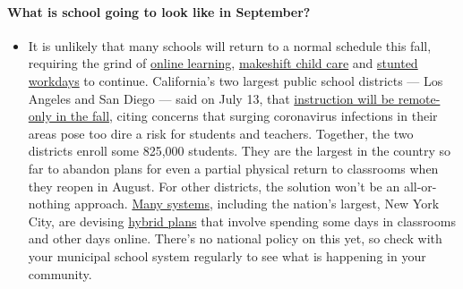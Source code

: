 \begin{itemize}
{  \paragraph{What is school going to look like in
  September?}\label{what-is-school-going-to-look-like-in-september}}

  \begin{itemize}
  \tightlist
  \item
    It is unlikely that many schools will return to a normal schedule
    this fall, requiring the grind of
    \href{https://www.nytimes3xbfgragh.onion/2020/06/05/us/coronavirus-education-lost-learning.html?action=click\&pgtype=Article\&state=default\&region=MAIN_CONTENT_3\&context=storylines_faq}{online
    learning},
    \href{https://www.nytimes3xbfgragh.onion/2020/05/29/us/coronavirus-child-care-centers.html?action=click\&pgtype=Article\&state=default\&region=MAIN_CONTENT_3\&context=storylines_faq}{makeshift
    child care} and
    \href{https://www.nytimes3xbfgragh.onion/2020/06/03/business/economy/coronavirus-working-women.html?action=click\&pgtype=Article\&state=default\&region=MAIN_CONTENT_3\&context=storylines_faq}{stunted
    workdays} to continue. California's two largest public school
    districts --- Los Angeles and San Diego --- said on July 13, that
    \href{https://www.nytimes3xbfgragh.onion/2020/07/13/us/lausd-san-diego-school-reopening.html?action=click\&pgtype=Article\&state=default\&region=MAIN_CONTENT_3\&context=storylines_faq}{instruction
    will be remote-only in the fall}, citing concerns that surging
    coronavirus infections in their areas pose too dire a risk for
    students and teachers. Together, the two districts enroll some
    825,000 students. They are the largest in the country so far to
    abandon plans for even a partial physical return to classrooms when
    they reopen in August. For other districts, the solution won't be an
    all-or-nothing approach.
    \href{https://bioethics.jhu.edu/research-and-outreach/projects/eschool-initiative/school-policy-tracker/}{Many
    systems}, including the nation's largest, New York City, are
    devising
    \href{https://www.nytimes3xbfgragh.onion/2020/06/26/us/coronavirus-schools-reopen-fall.html?action=click\&pgtype=Article\&state=default\&region=MAIN_CONTENT_3\&context=storylines_faq}{hybrid
    plans} that involve spending some days in classrooms and other days
    online. There's no national policy on this yet, so check with your
    municipal school system regularly to see what is happening in your
    community.
  \end{itemize}
\end{itemize}

